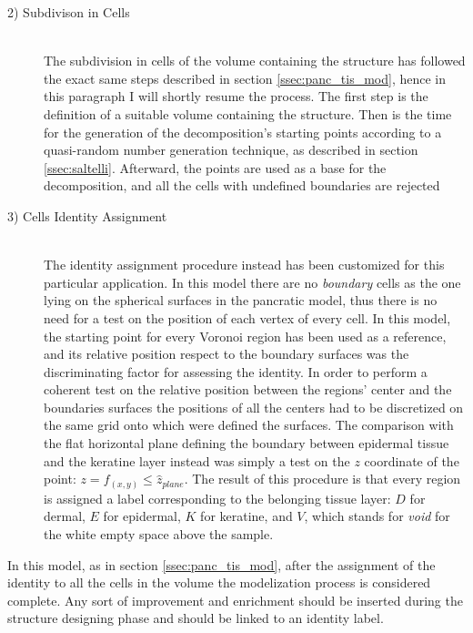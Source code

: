 \documentclass[12pt,a4paper]{report}
\begin{document}
\begin{description}
    \item [2) Subdivison in Cells] \hfill \\
    The subdivision in cells of the volume containing the structure has followed the exact same steps described in section \ref{ssec:panc_tis_mod}, hence in this paragraph I will shortly resume the process. The first step is the definition of a suitable volume containing the structure. Then is the time for the generation of the decomposition's starting points according to a quasi-random number generation technique, as described in section \ref{ssec:saltelli}. Afterward, the points are used as a base for the decomposition, and all the cells with undefined boundaries are rejected

    \item [3) Cells Identity Assignment] \hfill \\
    The identity assignment procedure instead has been customized for this particular application. In this model there are no \textit{boundary} cells as the one lying on the spherical surfaces in the pancratic model, thus there is no need for a test on the position of each vertex of every cell. In this model, the starting point for every Voronoi region has been used as a reference, and its relative position respect to the boundary surfaces was the discriminating factor for assessing the identity. In order to perform a coherent test on the relative position between the regions' center and the boundaries surfaces the positions of all the centers had to be discretized on the same grid onto which were defined the surfaces. The comparison with the flat horizontal plane defining the boundary between epidermal tissue and the keratine layer instead was simply a test on the $z$ coordinate of the point: $z = f_{(x,y)} \leq \hat{z}_{plane}$. The result of this procedure is that every region is assigned a label corresponding to the belonging tissue layer: $D$ for dermal, $E$ for epidermal, $K$ for keratine, and $V$, which stands for \textit{void} for the white empty space above the sample.

\end{description}

In this model, as in section \ref{ssec:panc_tis_mod}, after the assignment of the identity to all the cells in the volume the modelization process is considered complete. Any sort of improvement and enrichment should be inserted during the structure designing phase and should be linked to an identity label.

        \clearpage
\end{document}
